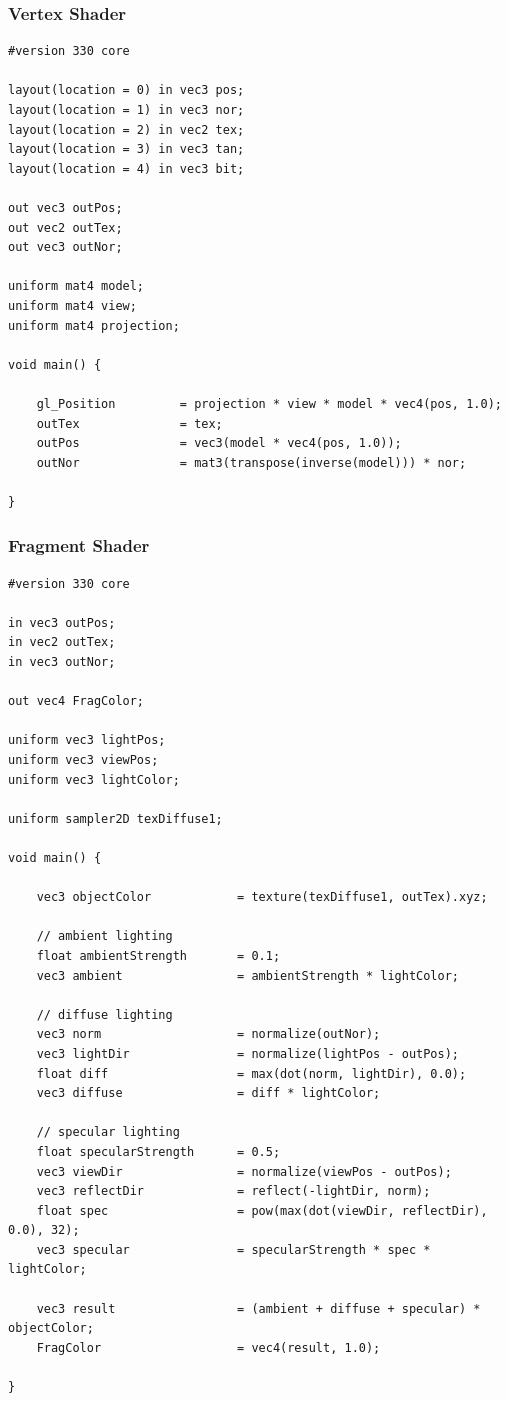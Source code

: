 \documentclass[titlepage, 11pt, a4paper, ngerman]{article}
\begin{document}
\subsubsection{Vertex Shader}
\begin{verbatim}
#version 330 core

layout(location = 0) in vec3 pos;
layout(location = 1) in vec3 nor;
layout(location = 2) in vec2 tex;
layout(location = 3) in vec3 tan;
layout(location = 4) in vec3 bit;

out vec3 outPos;
out vec2 outTex;
out vec3 outNor;

uniform mat4 model;
uniform mat4 view;
uniform mat4 projection;

void main() {

    gl_Position         = projection * view * model * vec4(pos, 1.0);
    outTex              = tex;
    outPos              = vec3(model * vec4(pos, 1.0));
    outNor              = mat3(transpose(inverse(model))) * nor;

}
\end{verbatim}

\subsubsection{Fragment Shader}
\begin{verbatim}
#version 330 core

in vec3 outPos;
in vec2 outTex;
in vec3 outNor;

out vec4 FragColor;

uniform vec3 lightPos;
uniform vec3 viewPos;
uniform vec3 lightColor;

uniform sampler2D texDiffuse1;

void main() {

    vec3 objectColor            = texture(texDiffuse1, outTex).xyz;

    // ambient lighting
    float ambientStrength       = 0.1;
    vec3 ambient                = ambientStrength * lightColor;

    // diffuse lighting
    vec3 norm                   = normalize(outNor);
    vec3 lightDir               = normalize(lightPos - outPos);
    float diff                  = max(dot(norm, lightDir), 0.0);
    vec3 diffuse                = diff * lightColor;

    // specular lighting
    float specularStrength      = 0.5;
    vec3 viewDir                = normalize(viewPos - outPos);
    vec3 reflectDir             = reflect(-lightDir, norm);
    float spec                  = pow(max(dot(viewDir, reflectDir), 0.0), 32);
    vec3 specular               = specularStrength * spec * lightColor;

    vec3 result                 = (ambient + diffuse + specular) * objectColor;
    FragColor                   = vec4(result, 1.0);

}
\end{verbatim}
\end{document}
